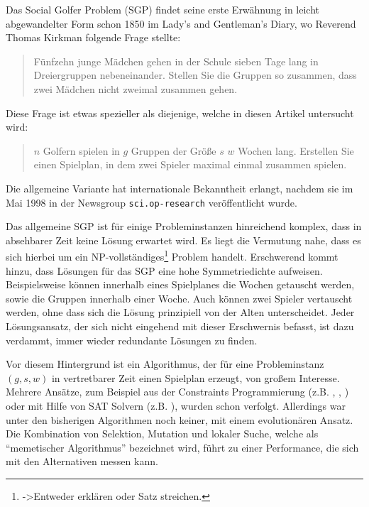 Das Social Golfer Problem (SGP) findet seine erste Erwähnung in leicht abgewandelter Form schon 1850 im Lady's and Gentleman's Diary, wo Reverend Thomas Kirkman folgende Frage stellte:

\begin{quote}
Fünfzehn junge Mädchen gehen in der Schule sieben Tage lang in Dreiergruppen nebeneinander. Stellen Sie die Gruppen so zusammen, dass zwei Mädchen nicht zweimal zusammen gehen.
\end{quote}
Diese Frage ist etwas spezieller als diejenige, welche in diesen Artikel untersucht wird:
\begin{quote}
$n$ Golfern spielen in $g$ Gruppen der Größe $s$ $w$ Wochen lang. Erstellen Sie einen Spielplan, in dem zwei Spieler maximal einmal zusammen spielen.
\end{quote}
Die allgemeine Variante hat internationale Bekanntheit erlangt, nachdem sie im Mai 1998 in der Newsgroup \texttt{sci.op-research} veröffentlicht wurde.

Das allgemeine SGP ist für einige Probleminstanzen hinreichend komplex, dass in absehbarer Zeit keine Lösung erwartet wird. Es liegt die Vermutung nahe, dass es sich hierbei um ein NP-vollständiges\footnote{->Entweder erklären oder Satz streichen.} Problem handelt.
Erschwerend kommt hinzu, dass Lösungen für das SGP eine hohe Symmetriedichte aufweisen. Beispielsweise können innerhalb eines Spielplanes die Wochen getauscht werden, sowie die Gruppen innerhalb einer Woche. Auch können zwei Spieler vertauscht werden, ohne dass sich die Lösung prinzipiell von der Alten unterscheidet. Jeder Lösungsansatz, der sich nicht eingehend mit dieser Erschwernis befasst, ist dazu verdammt, immer wieder redundante Lösungen zu finden.

Vor diesem Hintergrund ist ein Algorithmus, der für eine Probleminstanz $(g,s,w)$ in vertretbarer Zeit einen Spielplan erzeugt, von großem Interesse.
Mehrere Ansätze, zum Beispiel aus der Constraints Programmierung (z.B. \cite{fahle01}, \cite{smith01}, \cite{sellmann02}) oder mit Hilfe von SAT Solvern (z.B. \cite{triska08}), wurden schon verfolgt. Allerdings war unter den bisherigen Algorithmen noch keiner, mit einem evolutionären Ansatz.
Die Kombination von Selektion, Mutation und lokaler Suche, welche als \enquote{memetischer Algorithmus} bezeichnet wird, führt zu einer Performance, die sich mit den Alternativen messen kann.


